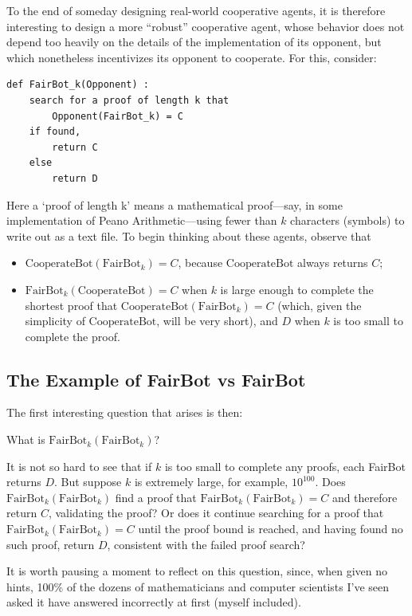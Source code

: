 \documentclass[onecolumn,authordate]{miri-tech-article}
\numberwithin{equation}{section}
\theoremstyle{definition}
\renewcommand{\-}{^{-1}}
\newcommand{\CB}{\mathrm{CooperateBot}}
\newcommand{\FB}{\mathrm{FairBot}}
\begin{document}
To the end of someday designing real-world cooperative agents, it is therefore interesting to design a more ``robust'' cooperative agent, whose behavior does not depend too heavily on the details of the implementation of its opponent, but which nonetheless incentivizes its opponent to cooperate.  For this, consider:

\begin{Verbatim}[frame=single]
def FairBot_k(Opponent) :
	search for a proof of length k that  
		Opponent(FairBot_k) = C
	if found,
		return C
	else
		return D
\end{Verbatim}

\noindent Here a `proof of length k' means a mathematical proof---say, in some implementation of Peano Arithmetic---using fewer than $k$ characters (symbols) to write out as a text file.  To begin thinking about these agents, observe that

\begin{itemize}
\item $\CB(\FB_k) = C$, because $\CB$ always returns $C$;
\item $\FB_k(\CB) = C$ when $k$ is large enough to complete the shortest proof that $\CB(\FB_k)=C$ (which, given the simplicity of $\CB$, will be very short), and $D$ when $k$ is too small to complete the proof.

\end{itemize}

\subsection{The Example of FairBot vs FairBot}

\noindent The first interesting question that arises is then:

\begin{center}
What is $\FB_k(\FB_k)$?
\end{center}

\noindent It is not so hard to see that if $k$ is too small to complete any proofs, each FairBot returns $D$.  But suppose $k$ is extremely large, for example, $10^{100}$.  Does $\FB_k(\FB_k)$ find a proof that $\FB_k(\FB_k)=C$ and therefore return $C$, validating the proof?  Or does it continue searching for a proof that $\FB_k(\FB_k)=C$ until the proof bound is reached, and having found no such proof, return $D$, consistent with the failed proof search?

It is worth pausing a moment to reflect on this question, since, when given no hints, 100\% of the dozens of mathematicians and computer scientists I've seen asked it have answered incorrectly at first (myself included).
\end{document}
